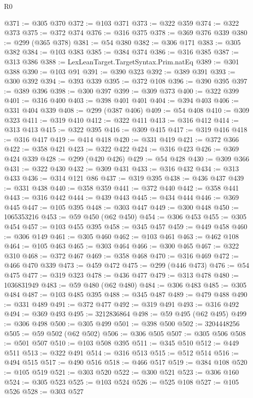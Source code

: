 \begin{lexlean}{R0}
\begin{coremodule}
@371 := @305 @370
@372 := @103 @371
@373 := @322 @359
@374 := @322 @373
@375 := @372 @374
@376 := @316 @375
@378 := @369 @376 @339
@380 := @299 (@365 @378)
@381 := @54 @380
@382 := @306 @171
@383 := @305 @382
@384 := @103 @383
@385 := @384 @374
@386 := @316 @385
@387 := @313 @386
@388 := LexLeanTarget.TargetSyntax.Prim.natEq
@389 := @301 @388
@390 := @103 @91
@391 := @390 @323
@392 := @389 @391
@393 := @300 @392
@394 := @393 @339
@395 := @372 @108
@396 := @390 @395
@397 := @389 @396
@398 := @300 @397
@399 := @309 @373
@400 := @322 @399
@401 := @316 @400
@403 := @398 @401 @401
@404 := @394 @403
@406 := @331 @404 @339
@408 := @299 (@387 @406)
@409 := @54 @408
@410 := @309 @323
@411 := @319 @410
@412 := @322 @411
@413 := @316 @412
@414 := @313 @413
@415 := @322 @395
@416 := @309 @415
@417 := @319 @416
@418 := @316 @417
@419 := @414 @418
@420 := @331 @419
@421 := @372 @366
@422 := @358 @421
@423 := @322 @422
@424 := @316 @423
@426 := @369 @424 @339
@428 := @299 (@420 @426)
@429 := @54 @428
@430 := @309 @366
@431 := @322 @430
@432 := @309 @431
@433 := @316 @432
@434 := @313 @433
@436 := @314 @121 @86
@437 := @319 @395
@438 := @436 @437
@439 := @331 @438
@440 := @358 @359
@441 := @372 @440
@442 := @358 @441
@443 := @316 @442
@444 := @439 @443
@445 := @434 @444
@446 := @369 @445
@447 := @105 @395
@448 := @303 @447
@449 := @300 @448
@450 := 1065353216
@453 := @59 @450 (@62 @450)
@454 := @306 @453
@455 := @305 @454
@457 := @103 @455 @395
@458 := @345 @457
@459 := @449 @458
@460 := @306 @149
@461 := @305 @460
@462 := @103 @461
@463 := @462 @108
@464 := @105 @463
@465 := @303 @464
@466 := @300 @465
@467 := @322 @310
@468 := @372 @467
@469 := @358 @468
@470 := @316 @469
@472 := @466 @470 @339
@473 := @459 @472
@475 := @299 (@446 @473)
@476 := @54 @475
@477 := @319 @323
@478 := @436 @477
@479 := @313 @478
@480 := 1036831949
@483 := @59 @480 (@62 @480)
@484 := @306 @483
@485 := @305 @484
@487 := @103 @485 @395
@488 := @345 @487
@489 := @479 @488
@490 := @331 @489
@491 := @372 @477
@492 := @319 @491
@493 := @316 @492
@494 := @369 @493
@495 := 3212836864
@498 := @59 @495 (@62 @495)
@499 := @306 @498
@500 := @305 @499
@501 := @398 @500
@502 := 3204448256
@505 := @59 @502 (@62 @502)
@506 := @306 @505
@507 := @305 @506
@508 := @501 @507
@510 := @103 @508 @395
@511 := @345 @510
@512 := @449 @511
@513 := @322 @491
@514 := @316 @513
@515 := @512 @514
@516 := @494 @515
@517 := @490 @516
@518 := @466 @517
@519 := @384 @108
@520 := @105 @519
@521 := @303 @520
@522 := @300 @521
@523 := @306 @160
@524 := @305 @523
@525 := @103 @524
@526 := @525 @108
@527 := @105 @526
@528 := @303 @527

\end{coremodule}
\end{lexlean}
